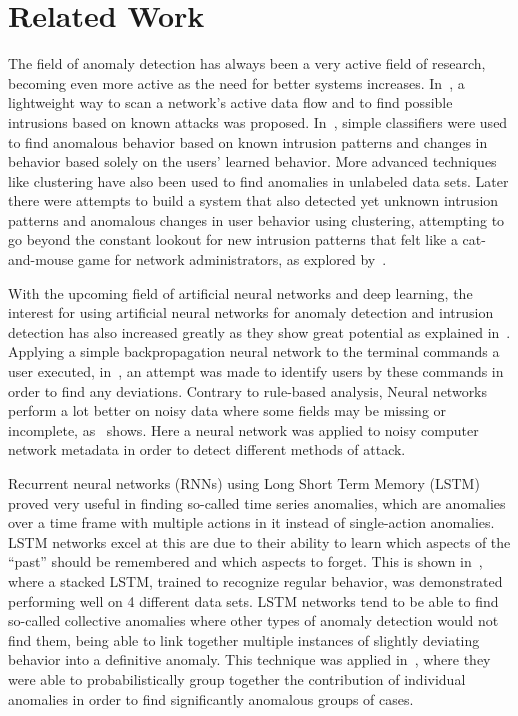 \chapter{Related Work}\label{ch:related_work}

The field of anomaly detection has always been a very active field of research, becoming even more active as the need for better systems increases. In~\cite{roesch1999snort}, a lightweight way to scan a network's active data flow and to find possible intrusions based on known attacks was proposed. In~\cite{lee1998data}, simple classifiers were used to find anomalous behavior based on known intrusion patterns and changes in behavior based solely on the users' learned behavior. More advanced techniques like clustering have also been used to find anomalies in unlabeled data sets. Later there were attempts to build a system that also detected yet unknown intrusion patterns and anomalous changes in user behavior using clustering, attempting to go beyond the constant lookout for new intrusion patterns that felt like a cat-and-mouse game for network administrators, as explored by~\cite{Portnoy01intrusiondetection}.

With the upcoming field of artificial neural networks and deep learning, the interest for using artificial neural networks for anomaly detection and intrusion detection has also increased greatly as they show great potential as explained in~\cite{lecun2015deep}. Applying a simple backpropagation neural network to the terminal commands a user executed, in~\cite{ryan1998intrusion}, an attempt was made to identify users by these commands in order to find any deviations. Contrary to rule-based analysis, Neural networks perform a lot better on noisy data where some fields may be missing or incomplete, as~\cite{cannady1998artificial} shows. Here a neural network was applied to noisy computer network metadata in order to detect different methods of attack.

Recurrent neural networks (RNNs) using Long Short Term Memory (LSTM) proved very useful in finding so-called time series anomalies, which are anomalies over a time frame with multiple actions in it instead of single-action anomalies. LSTM networks excel at this are due to their ability to learn which aspects of the \enquote{past} should be remembered and which aspects to forget. This is shown in~\cite{malhotra2015long}, where a stacked LSTM, trained to recognize regular behavior, was demonstrated performing well on 4 different data sets. LSTM networks tend to be able to find so-called collective anomalies where other types of anomaly detection would not find them, being able to link together multiple instances of slightly deviating behavior into a definitive anomaly. This technique was applied in~\cite{olsson2015probabilistic}, where they were able to probabilistically group together the contribution of individual anomalies in order to find significantly anomalous groups of cases.